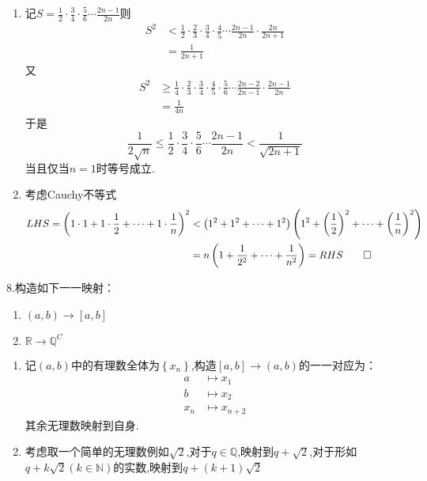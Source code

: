 \begin{Proof}
    \begin{enumerate}[label={\textup{(\arabic*)}}]
        \item 记$\displaystyle S=\frac{1}{2}\cdot\frac{3}{4}\cdot\frac{5}{6}\cdots\frac{2n-1}{2n}$则\begin{align*}
            S^2&< \frac{1}{2}\cdot\frac{2}{3}\cdot\frac{3}{4}\cdot\frac{4}{5}\cdots\frac{2n-1}{2n}\cdot\frac{2n}{2n+1}\\
            &=\frac{1}{2n+1}
        \end{align*}又\begin{align*}
            S^2&\geqslant \frac{1}{4}\cdot\frac{2}{3}\cdot\frac{3}{4}\cdot\frac{4}{5}\cdot\frac{5}{6}\cdots\frac{2n-2}{2n-1}\cdot\frac{2n-1}{2n}\\
            &=\frac{1}{4n}
        \end{align*}于是\[
        \frac{1}{2\sqrt{n}}\leqslant \frac{1}{2}\cdot\frac{3}{4}\cdot\frac{5}{6}\cdots\frac{2n-1}{2n}<\frac{1}{\sqrt{2n+1}}
        \]当且仅当$n=1$时等号成立.
        \item 考虑Cauchy不等式\begin{align*}LHS=
            \left(
                1\cdot 1+1\cdot\frac{1}{2}+\cdots+1\cdot\frac{1}{n}
            \right)^2&< \left(
                1^2+1^2+\cdots+1^2
            \right)\left(
                1^2+\left(\frac{1}{2}\right)^2+\cdots+\left(\frac{1}{n}\right)^2
            \right)\\
            &=n\left(
                1+\frac{1}{2^2}+\cdots+\frac{1}{n^2}
            \right)=RHS\qedhere
        \end{align*}
    \end{enumerate}
\end{Proof}
8.构造如下一一映射：\begin{enumerate}[label={\textup{(\arabic*)}}]
    \item $\left(a,b\right)\longrightarrow\left[a,b\right]$
    \item $\mathbb{R}\longrightarrow\mathbb{Q}^C$
\end{enumerate}
\begin{solution}
    \begin{enumerate}[label={\textup{(\arabic*)}}]
        \item 记$\left(a,b\right)$中的有理数全体为$\left\{x_n\right\}$,构造$\left[a,b\right]\longrightarrow\left(a,b\right)$的一一对应为：\begin{align*}
            a&\longmapsto x_1\\
            b&\longmapsto x_2\\
            x_n&\longmapsto x_{n+2}
        \end{align*}其余无理数映射到自身.
        \item 考虑取一个简单的无理数例如$\sqrt{2}$,对于$q\in\mathbb{Q}$,映射到$q+\sqrt{2}$,对于形如$q+k\sqrt{2}\left(k\in\mathbb{N}\right)$的实数,映射到$q+\left(
            k+1
        \right)\sqrt{2}$
    \end{enumerate}
\end{solution}